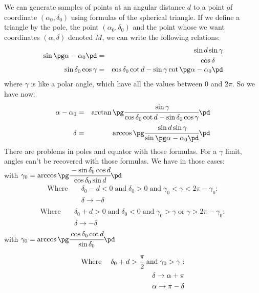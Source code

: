 We can generate samples of points at an angular distance $d$ to a point of coordinate $(\alpha_0,\delta_0)$ using formulas of the
spherical triangle. If we define a triangle by the pole, the point $(\alpha_0,\delta_0)$ and the point whose we want coordinates
$(\alpha,\delta)$ denoted $M$, we can write the following relations:
\begin{eqnarray}
        \sin\pg\alpha-\alpha_0\pd&=&\cfrac{\sin{d}\sin\gamma}{\cos\delta}\nonumber\\
        \sin\delta_0\cos\gamma&=&\cos\delta_0\cot{d}-\sin\gamma\cot\pg\alpha-\alpha_0\pd\nonumber\\
\end{eqnarray}
where $\gamma$ is like a polar angle, which have all the values between 0 and $\num{2}\pi$.
So we have now:
\begin{eqnarray}
        \alpha-\alpha_0 &=& \arctan\pg\cfrac{\sin\gamma}{\cos\delta_0\cot{d}-\sin\delta_0\cos\gamma}\pd\nonumber\\
        \delta &=& \arccos\pg\cfrac{\sin{d}\sin\gamma}{\sin\pg\alpha-\alpha_0\pd}\pd\nonumber\\
\end{eqnarray}
There are problems in poles and equator with those formulas. For a $\gamma$ limit, angles can't be recovered with those formulas.
We have in those cases:\\
with $\gamma_0=\arccos\pg\cfrac{-\sin\delta_0\cos{d}}{\cos\delta_0\sin{d}}\pd$
\begin{eqnarray}
        \mathrm{Where}&\;& \delta_0-d<0\; \mathrm{and} \;\delta_0>0 \; \mathrm{and}\; \gamma_0<\gamma<2\pi-\gamma_0:\nonumber\\
        & & \delta\rightarrow-\delta\nonumber\\
\end{eqnarray}
\begin{eqnarray}
        \mathrm{Where}&\;& \delta_0+d>0\; \mathrm{and}\;\delta_0<0 \; \mathrm{and}\; \gamma_0>\gamma\;\mathrm{or}\;\gamma>2\pi-\gamma_0:\nonumber\\
        & & \delta\rightarrow-\delta\nonumber\\
\end{eqnarray}
with $\gamma_0=\arccos\pg\cfrac{\cos\delta_0\cot{d}}{\sin\delta_0}\pd$
\begin{eqnarray}
        \mathrm{Where}&\;& \delta_0+d>\cfrac{\pi}{2} \; \mathrm{and}\; \gamma_0>\gamma:\nonumber\\
        & & \delta\rightarrow\alpha+\pi\nonumber\\
        & & \alpha\rightarrow\pi-\delta\nonumber\\
\end{eqnarray}
